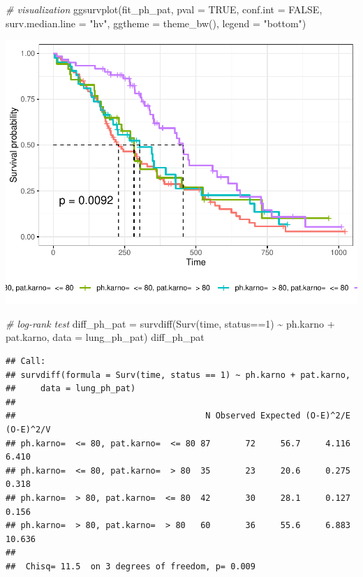 \documentclass[
]{article}
\newenvironment{Shaded}{\begin{snugshade}}{\end{snugshade}}
\newcommand{\AttributeTok}[1]{\textcolor[rgb]{0.77,0.63,0.00}{#1}}
\newcommand{\CommentTok}[1]{\textcolor[rgb]{0.56,0.35,0.01}{\textit{#1}}}
\newcommand{\ConstantTok}[1]{\textcolor[rgb]{0.00,0.00,0.00}{#1}}
\newcommand{\DecValTok}[1]{\textcolor[rgb]{0.00,0.00,0.81}{#1}}
\newcommand{\FunctionTok}[1]{\textcolor[rgb]{0.00,0.00,0.00}{#1}}
\newcommand{\NormalTok}[1]{#1}
\newcommand{\OtherTok}[1]{\textcolor[rgb]{0.56,0.35,0.01}{#1}}
\newcommand{\SpecialCharTok}[1]{\textcolor[rgb]{0.00,0.00,0.00}{#1}}
\newcommand{\StringTok}[1]{\textcolor[rgb]{0.31,0.60,0.02}{#1}}
\begin{document}
\begin{Shaded}
\begin{Highlighting}[]
\CommentTok{\# visualization}
\FunctionTok{ggsurvplot}\NormalTok{(fit\_ph\_pat,}
           \AttributeTok{pval =} \ConstantTok{TRUE}\NormalTok{, }\AttributeTok{conf.int =} \ConstantTok{FALSE}\NormalTok{,}
           \AttributeTok{surv.median.line =} \StringTok{"hv"}\NormalTok{, }
           \AttributeTok{ggtheme =} \FunctionTok{theme\_bw}\NormalTok{(), }
           \AttributeTok{legend =} \StringTok{"bottom"}\NormalTok{)}
\end{Highlighting}
\end{Shaded}

\includegraphics{final_project_files/figure-latex/unnamed-chunk-25-1.pdf}

\begin{Shaded}
\begin{Highlighting}[]
\CommentTok{\# log{-}rank test}
\NormalTok{diff\_ph\_pat }\OtherTok{=} \FunctionTok{survdiff}\NormalTok{(}\FunctionTok{Surv}\NormalTok{(time, status}\SpecialCharTok{==}\DecValTok{1}\NormalTok{) }\SpecialCharTok{\textasciitilde{}}\NormalTok{ ph.karno }\SpecialCharTok{+}\NormalTok{ pat.karno, }\AttributeTok{data =}\NormalTok{ lung\_ph\_pat) }
\NormalTok{diff\_ph\_pat}
\end{Highlighting}
\end{Shaded}

\begin{verbatim}
## Call:
## survdiff(formula = Surv(time, status == 1) ~ ph.karno + pat.karno, 
##     data = lung_ph_pat)
## 
##                                      N Observed Expected (O-E)^2/E (O-E)^2/V
## ph.karno=  <= 80, pat.karno=  <= 80 87       72     56.7     4.116     6.410
## ph.karno=  <= 80, pat.karno=  > 80  35       23     20.6     0.275     0.318
## ph.karno=  > 80, pat.karno=  <= 80  42       30     28.1     0.127     0.156
## ph.karno=  > 80, pat.karno=  > 80   60       36     55.6     6.883    10.636
## 
##  Chisq= 11.5  on 3 degrees of freedom, p= 0.009
\end{verbatim}
\end{document}
